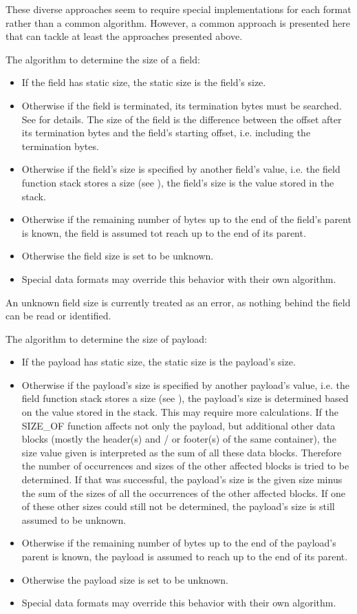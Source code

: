 These diverse approaches seem to require special implementations for each format rather than a common algorithm. However, a common approach is presented here that can tackle at least the approaches presented above.

The algorithm to determine the size of a field:
\begin{itemize}
	\item If the field has static size, the static size is the field's size.
	\item Otherwise if the field is terminated, its termination bytes must be searched. See  for details. The size of the field is the difference between the offset after its termination bytes and the field's starting offset, i.e. including the termination bytes.
	\item Otherwise if the field's size is specified by another field's value, i.e. the field function stack stores a size (see ), the field's size is the value stored in the stack.
	\item Otherwise if the remaining number of bytes up to the end of the field's parent is known, the field is assumed tot reach up to the end of its parent.
	\item Otherwise the field size is set to be unknown.
	\item Special data formats may override this behavior with their own algorithm.
\end{itemize}

An unknown field size is currently treated as an error, as nothing behind the field can be read or identified.

The algorithm to determine the size of payload:
\begin{itemize}
	\item If the payload has static size, the static size is the payload's size.
	\item Otherwise if the payload's size is specified by another payload's value, i.e. the field function stack stores a size (see ), the payload's size is determined based on the value stored in the stack. This may require more calculations. If the SIZE\_OF function affects not only the payload, but additional other data blocks (mostly the header(s) and / or footer(s) of the same container), the size value given is interpreted as the sum of all these data blocks. Therefore the number of occurrences and sizes of the other affected blocks is tried to be determined. If that was successful, the payload's size is the given size minus the sum of the sizes of all the occurrences of the other affected blocks. If one of these other sizes could still not be determined, the payload's size is still assumed to be unknown.
	\item Otherwise if the remaining number of bytes up to the end of the payload's parent is known, the payload is assumed to reach up to the end of its parent.
	\item Otherwise the payload size is set to be unknown.
	\item Special data formats may override this behavior with their own algorithm.
\end{itemize}

